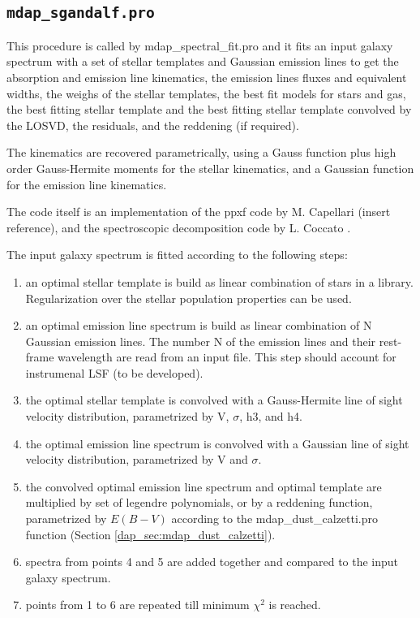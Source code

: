 \subsection{{\tt mdap\_sgandalf.pro}}
\label{dap_sec:mdap_sgandalf}

This procedure is called by mdap\_spectral\_fit.pro and it fits an
input galaxy spectrum with a set of stellar templates and Gaussian
emission lines to get the absorption and emission line kinematics, the
emission lines fluxes and equivalent widths, the weighs of the stellar
templates, the best fit models for stars and gas, the best fitting
stellar template and the best fitting stellar template convolved by
the LOSVD, the residuals, and the reddening (if required).

The kinematics are recovered parametrically, using a Gauss function
plus high order Gauss-Hermite moments for the stellar kinematics, and
a Gaussian function for the emission line kinematics.

The code itself is an implementation of the ppxf code by M. Capellari
(insert reference), and the spectroscopic decomposition code by
L. Coccato \citep{Coccato+11}.

The input galaxy spectrum is fitted according to the following steps:

\begin{enumerate}

  \item an optimal stellar template is build as linear combination of
    stars in a library. Regularization over the stellar population
    properties can be used.

  \item an optimal emission line spectrum is build as linear
    combination of N Gaussian emission lines. The number N of the
    emission lines and their rest-frame wavelength are read from an
    input file. This step should account for instrumenal LSF (to be
    developed).

  \item the optimal stellar template is convolved with a Gauss-Hermite
    line of sight velocity distribution, parametrized by V, $\sigma$,
    h3, and h4.

  \item the optimal emission line spectrum is convolved with a
    Gaussian line of sight velocity distribution, parametrized by V
    and $\sigma$.

  \item the convolved optimal emission line spectrum and optimal
    template are multiplied by set of legendre polynomials, or by a
    reddening function, parametrized by $E(B-V)$ according to the
    mdap\_dust\_calzetti.pro function (Section
    \ref{dap_sec:mdap_dust_calzetti}).

  \item spectra from points 4 and 5 are added together and compared to
    the input galaxy spectrum.

  \item points from 1 to 6 are repeated till minimum $\chi^2$ is
    reached.

\end{enumerate}

